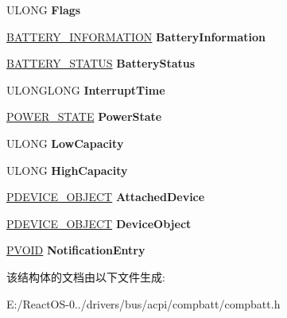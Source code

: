 \begin{DoxyCompactItemize}
U\+L\+O\+NG {\bfseries Flags}
\item 
\mbox{\label{struct___c_o_m_p_b_a_t_t___d_e_v_i_c_e___e_x_t_e_n_s_i_o_n_a735e92f2d1aa2f41805b5f8fddbef391}} 
\hyperlink{struct___b_a_t_t_e_r_y___i_n_f_o_r_m_a_t_i_o_n}{B\+A\+T\+T\+E\+R\+Y\+\_\+\+I\+N\+F\+O\+R\+M\+A\+T\+I\+ON} {\bfseries Battery\+Information}
\item 
\mbox{\label{struct___c_o_m_p_b_a_t_t___d_e_v_i_c_e___e_x_t_e_n_s_i_o_n_a7cd71d4d7c346326b654e74b4626cf0c}} 
\hyperlink{struct___b_a_t_t_e_r_y___s_t_a_t_u_s}{B\+A\+T\+T\+E\+R\+Y\+\_\+\+S\+T\+A\+T\+US} {\bfseries Battery\+Status}
\item 
\mbox{\label{struct___c_o_m_p_b_a_t_t___d_e_v_i_c_e___e_x_t_e_n_s_i_o_n_a617543a04db8ebcbea488922050ff299}} 
U\+L\+O\+N\+G\+L\+O\+NG {\bfseries Interrupt\+Time}
\item 
\mbox{\label{struct___c_o_m_p_b_a_t_t___d_e_v_i_c_e___e_x_t_e_n_s_i_o_n_a1d7036d4b55b3d9414776d6bab932901}} 
\hyperlink{union___p_o_w_e_r___s_t_a_t_e}{P\+O\+W\+E\+R\+\_\+\+S\+T\+A\+TE} {\bfseries Power\+State}
\item 
\mbox{\label{struct___c_o_m_p_b_a_t_t___d_e_v_i_c_e___e_x_t_e_n_s_i_o_n_ab4ef7aef7158bebf1cbbb08b6bc5dc11}} 
U\+L\+O\+NG {\bfseries Low\+Capacity}
\item 
\mbox{\label{struct___c_o_m_p_b_a_t_t___d_e_v_i_c_e___e_x_t_e_n_s_i_o_n_ad5fcef8896e5dbd673620a12eeda60bc}} 
U\+L\+O\+NG {\bfseries High\+Capacity}
\item 
\mbox{\label{struct___c_o_m_p_b_a_t_t___d_e_v_i_c_e___e_x_t_e_n_s_i_o_n_a5cf6fec98885557761a6c357dfbd3ce1}} 
\hyperlink{struct___d_e_v_i_c_e___o_b_j_e_c_t}{P\+D\+E\+V\+I\+C\+E\+\_\+\+O\+B\+J\+E\+CT} {\bfseries Attached\+Device}
\item 
\mbox{\label{struct___c_o_m_p_b_a_t_t___d_e_v_i_c_e___e_x_t_e_n_s_i_o_n_a5cd3232cf2ed4d9fb303c1aad201f510}} 
\hyperlink{struct___d_e_v_i_c_e___o_b_j_e_c_t}{P\+D\+E\+V\+I\+C\+E\+\_\+\+O\+B\+J\+E\+CT} {\bfseries Device\+Object}
\item 
\mbox{\label{struct___c_o_m_p_b_a_t_t___d_e_v_i_c_e___e_x_t_e_n_s_i_o_n_a85e30fcd0167c9906f3bbd82cedb21ad}} 
\hyperlink{interfacevoid}{P\+V\+O\+ID} {\bfseries Notification\+Entry}
\end{DoxyCompactItemize}


该结构体的文档由以下文件生成\+:\begin{DoxyCompactItemize}
\item 
E\+:/\+React\+O\+S-\/0../drivers/bus/acpi/compbatt/compbatt.\+h\end{DoxyCompactItemize}
